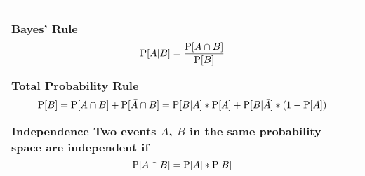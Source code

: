 {\tabulinesep=1mm
\begin{tabu}{|p{16cm} |}
\hline
\vspace{2 mm}
\textbf{Bayes' Rule} 
\[ \P[A|B] = \frac{\P[A \cap B]}{\P[B]} \]

\textbf{Total Probability Rule}
\[ \P[B] = \P[A \cap B] + \P[ \bar{A} \cap B] = \P[B|A] * \P[A] + 
\P[B|\bar{A}]*(1 - \P[A])\]

\textbf{Independence} \newline 
Two events $A$, $B$ in the same probability space are independent if 
\[\P[A \cap B] = \P[A] * \P[B] \]
\\
\hline
\end{tabu}
}